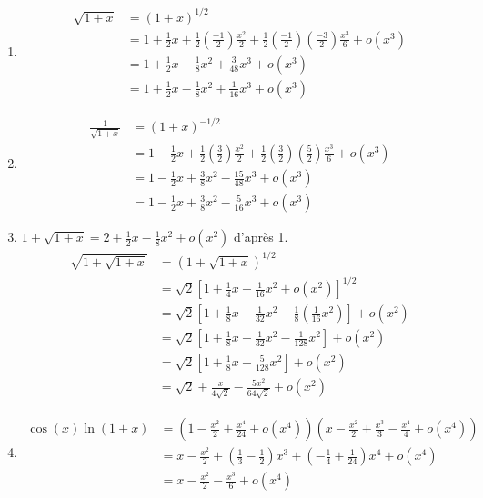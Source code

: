 \begin{Sol}
\begin{enumerate}
    \item
    {$$
     \begin{aligned}
     \sqrt{1 + x} &= (1 + x)^{1/2}\\
     &= 1 + \frac{1}{2}x + \frac{1}{2} \left( \frac{-1}{2} \right) \frac{x^2}{2} + \frac{1}{2} \left( \frac{-1}{2} \right) \left( \frac{-3}{2} \right) \frac{x^3}{6} + o(x^3)\\
     &= 1 + \frac{1}{2}x - \frac{1}{8}x^2 + \frac{3}{48}x^3 + o(x^3) \\
     &= 1 + \frac{1}{2}x - \frac{1}{8}x^2 + \frac{1}{16}x^3 + o(x^3) 
     \end{aligned}$$
     }
\item     {$$
     \begin{aligned}
     \frac{1}{\sqrt{1 + x}} &= (1 + x)^{-1/2}\\
     & = 1 - \frac{1}{2}x + \frac{1}{2} \left( \frac{3}{2} \right) \frac{x^2}{2} + \frac{1}{2} \left( \frac{3}{2} \right) \left( \frac{5}{2} \right) \frac{x^3}{6} + o(x^3) \\
     &= 1 - \frac{1}{2}x + \frac{3}{8}x^2 - \frac{15}{48}x^3 + o(x^3) \\
     &= 1 - \frac{1}{2}x + \frac{3}{8}x^2 - \frac{5}{16}x^3 + o(x^3) 
      \end{aligned}$$
     }
\item  $1 + \sqrt{1 + x} = 2 + \frac{1}{2}x - \frac{1}{8}x^2 + o(x^2) $ d’après 1.\\
{$$
     \begin{aligned}  \sqrt{1 + \sqrt{1 + x}}& = \left( 1 + \sqrt{1 + x} \right)^{1/2}\\
     & = \sqrt{2} \left[ 1 + \frac{1}{4}x - \frac{1}{16}x^2 + o(x^2) \right]^{1/2}\\
     & = \sqrt{2} \left[ 1 + \frac{1}{8}x - \frac{1}{32}x^2 - \frac{1}{8} \left( \frac{1}{16}x^2 \right) \right] + o(x^2)\\
     & = \sqrt{2} \left[ 1 + \frac{1}{8}x - \frac{1}{32}x^2 - \frac{1}{128}x^2 \right] + o(x^2)\\
     & = \sqrt{2} \left[ 1 + \frac{1}{8}x - \frac{5}{128}x^2 \right] + o(x^2)\\
     & = \sqrt{2} + \frac{x}{4\sqrt{2}} - \frac{5x^2}{64\sqrt{2}} + o(x^2) 
       \end{aligned}$$
     }
\item  {$$
     \begin{aligned} \cos(x) \ln(1 + x) &= \left( 1 - \frac{x^2}{2} + \frac{x^4}{24} + o(x^4) \right) \left( x - \frac{x^2}{2} + \frac{x^3}{3} - \frac{x^4}{4} + o(x^4) \right)\\
     & = x - \frac{x^2}{2} + \left( \frac{1}{3} - \frac{1}{2} \right)x^3 + \left( -\frac{1}{4} + \frac{1}{24} \right)x^4 + o(x^4)\\
     & = x - \frac{x^2}{2} - \frac{x^3}{6} + o(x^4)
    \end{aligned}$$
     }
\end{enumerate}
\end{Sol}


